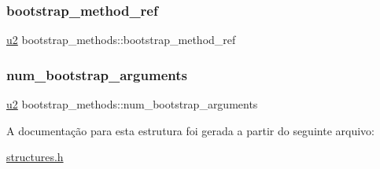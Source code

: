\subsubsection{\texorpdfstring{bootstrap\+\_\+method\+\_\+ref}{bootstrap\_method\_ref}}
{\footnotesize\ttfamily \hyperlink{lista__operandos_8h_a732cde1300aafb73b0ea6c2558a7a54f}{u2} bootstrap\+\_\+methods\+::bootstrap\+\_\+method\+\_\+ref}

\mbox{\label{structbootstrap__methods_aad28739e25a094400551fd1080fdb1f6}} 
\subsubsection{\texorpdfstring{num\+\_\+bootstrap\+\_\+arguments}{num\_bootstrap\_arguments}}
{\footnotesize\ttfamily \hyperlink{lista__operandos_8h_a732cde1300aafb73b0ea6c2558a7a54f}{u2} bootstrap\+\_\+methods\+::num\+\_\+bootstrap\+\_\+arguments}



A documentação para esta estrutura foi gerada a partir do seguinte arquivo\+:\begin{DoxyCompactItemize}
\item 
\hyperlink{structures_8h}{structures.\+h}\end{DoxyCompactItemize}

